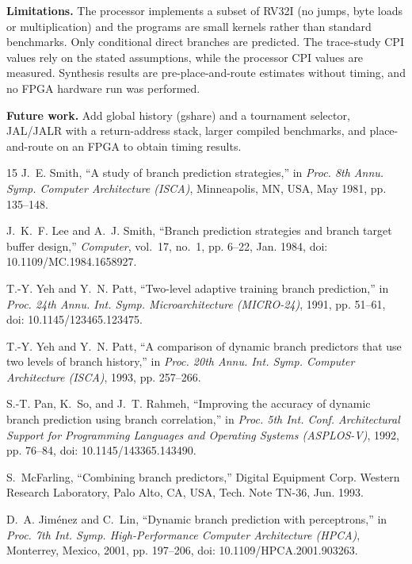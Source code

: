 \documentclass[conference]{IEEEtran}
\begin{document}
\textbf{Limitations.} The processor implements a subset of RV32I (no jumps, byte loads or
multiplication) and the programs are small kernels rather than standard benchmarks. Only
conditional direct branches are predicted. The trace-study CPI values rely on the stated
assumptions, while the processor CPI values are measured. Synthesis results are
pre-place-and-route estimates without timing, and no FPGA hardware run was performed.

\textbf{Future work.} Add global history (gshare) and a tournament selector, JAL/JALR with a
return-address stack, larger compiled benchmarks, and place-and-route on an FPGA to obtain timing
results.

\begin{thebibliography}{15}
J.~E. Smith, ``A study of branch prediction strategies,'' in \emph{Proc. 8th Annu. Symp. Computer
Architecture (ISCA)}, Minneapolis, MN, USA, May 1981, pp. 135--148.

J.~K.~F. Lee and A.~J. Smith, ``Branch prediction strategies and branch target buffer design,''
\emph{Computer}, vol.~17, no.~1, pp. 6--22, Jan. 1984, doi: 10.1109/MC.1984.1658927.

T.-Y. Yeh and Y.~N. Patt, ``Two-level adaptive training branch prediction,'' in \emph{Proc. 24th
Annu. Int. Symp. Microarchitecture (MICRO-24)}, 1991, pp. 51--61, doi: 10.1145/123465.123475.

T.-Y. Yeh and Y.~N. Patt, ``A comparison of dynamic branch predictors that use two levels of
branch history,'' in \emph{Proc. 20th Annu. Int. Symp. Computer Architecture (ISCA)}, 1993,
pp. 257--266.

S.-T. Pan, K.~So, and J.~T. Rahmeh, ``Improving the accuracy of dynamic branch prediction using
branch correlation,'' in \emph{Proc. 5th Int. Conf. Architectural Support for Programming
Languages and Operating Systems (ASPLOS-V)}, 1992, pp. 76--84, doi: 10.1145/143365.143490.

S.~McFarling, ``Combining branch predictors,'' Digital Equipment Corp. Western Research
Laboratory, Palo Alto, CA, USA, Tech. Note TN-36, Jun. 1993.

D.~A. Jim\'enez and C.~Lin, ``Dynamic branch prediction with perceptrons,'' in \emph{Proc. 7th
Int. Symp. High-Performance Computer Architecture (HPCA)}, Monterrey, Mexico, 2001,
pp. 197--206, doi: 10.1109/HPCA.2001.903263.


\end{thebibliography}
\end{document}
